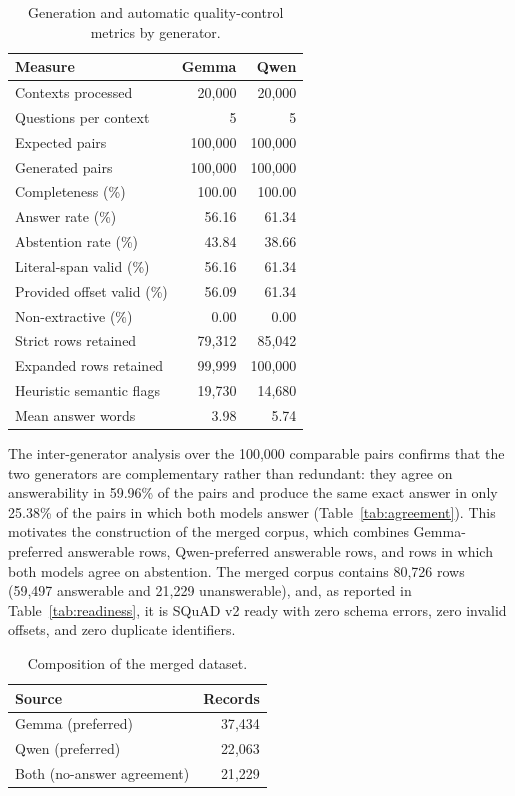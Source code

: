 \documentclass[graybox]{SNmult}
\begin{document}
\begin{table}[!t]
\caption{Generation and automatic quality-control metrics by generator.}
\label{tab:qc-results}
\centering
\small
\begin{tabular}{lrr}
\toprule
Measure & Gemma & Qwen \\
\midrule
Contexts processed & 20{,}000 & 20{,}000 \\
Questions per context & 5 & 5 \\
Expected pairs & 100{,}000 & 100{,}000 \\
Generated pairs & 100{,}000 & 100{,}000 \\
Completeness (\%) & 100.00 & 100.00 \\
Answer rate (\%) & 56.16 & 61.34 \\
Abstention rate (\%) & 43.84 & 38.66 \\
Literal-span valid (\%) & 56.16 & 61.34 \\
Provided offset valid (\%) & 56.09 & 61.34 \\
Non-extractive (\%) & 0.00 & 0.00 \\
Strict rows retained & 79{,}312 & 85{,}042 \\
Expanded rows retained & 99{,}999 & 100{,}000 \\
Heuristic semantic flags & 19{,}730 & 14{,}680 \\
Mean answer words & 3.98 & 5.74 \\
\bottomrule
\end{tabular}
\end{table}

The inter-generator analysis over the 100{,}000 comparable pairs confirms that
the two generators are complementary rather than redundant: they agree on
answerability in 59.96\% of the pairs and produce the same exact answer in
only 25.38\% of the pairs in which both models answer
(Table~\ref{tab:agreement}). This motivates the construction of the merged
corpus, which combines Gemma-preferred answerable rows, Qwen-preferred
answerable rows, and rows in which both models agree on abstention. The merged
corpus contains 80{,}726 rows (59{,}497 answerable and 21{,}229 unanswerable),
and, as reported in Table~\ref{tab:readiness}, it is SQuAD v2 ready with zero
schema errors, zero invalid offsets, and zero duplicate identifiers.

\begin{table}[!t]
\caption{Composition of the merged dataset.}
\label{tab:merged-composition}
\centering
\small
\begin{tabular}{lr}
\toprule
Source & Records \\
\midrule
Gemma (preferred) & 37{,}434 \\
Qwen (preferred) & 22{,}063 \\
Both (no-answer agreement) & 21{,}229 \\
\bottomrule
\end{tabular}
\end{table}
\end{document}
